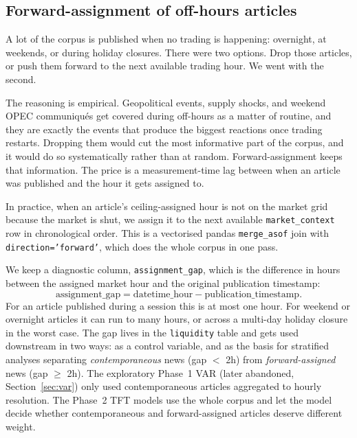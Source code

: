 \subsection{Forward-assignment of off-hours articles}\label{sec:forward-assignment}

A lot of the corpus is published when no trading is happening: overnight, at weekends, or during holiday closures. There were two options. Drop those articles, or push them forward to the next available trading hour. We went with the second.

The reasoning is empirical. Geopolitical events, supply shocks, and weekend OPEC communiqu\'es get covered during off-hours as a matter of routine, and they are exactly the events that produce the biggest reactions once trading restarts. Dropping them would cut the most informative part of the corpus, and it would do so systematically rather than at random. Forward-assignment keeps that information. The price is a measurement-time lag between when an article was published and the hour it gets assigned to.

In practice, when an article's ceiling-assigned hour is not on the market grid because the market is shut, we assign it to the next available \texttt{market\_context} row in chronological order. This is a vectorised pandas \texttt{merge\_asof} join with \texttt{direction='forward'}, which does the whole corpus in one pass.

We keep a diagnostic column, \texttt{assignment\_gap}, which is the difference in hours between the assigned market hour and the original publication timestamp:
\begin{equation}
  \text{assignment\_gap} = \text{datetime\_hour} - \text{publication\_timestamp} .
\end{equation}
For an article published during a session this is at most one hour. For weekend or overnight articles it can run to many hours, or across a multi-day holiday closure in the worst case. The gap lives in the \texttt{liquidity} table and gets used downstream in two ways: as a control variable, and as the basis for stratified analyses separating \emph{contemporaneous} news (gap $<$ 2h) from \emph{forward-assigned} news (gap $\geq$ 2h). The exploratory Phase~1 VAR (later abandoned, Section~\ref{sec:var}) only used contemporaneous articles aggregated to hourly resolution. The Phase~2 TFT models use the whole corpus and let the model decide whether contemporaneous and forward-assigned articles deserve different weight.


